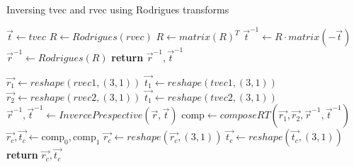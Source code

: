 
\begin{algorithm}
    \caption{Inversing tvec and rvec using Rodrigues transforms}\label{alg:inverse}
    \begin{algorithmic}[1]
        \State $\vec{t} \gets tvec$
        \State $R \gets Rodrigues(rvec)$ 
        \State $R \gets matrix(R)^{T}$ 
        \State $\vec{t}^{-1} \gets R \cdot matrix(-\vec{t})$ 
        \State $\vec{r}^{-1} \gets Rodrigues(R)$ 
        \State \textbf{return} $\vec{r}^{-1}, \vec{t}^{-1}$ 
        \EndProcedure
    \end{algorithmic}
\end{algorithm}



\begin{algorithm}
    \begin{algorithmic}[1]
        \State $\vec{r_1} \gets reshape(rvec1, (3,1))$ 
        \State $\vec{t_1} \gets reshape(tvec1, (3,1))$
        \State $\vec{r_2} \gets reshape(rvec2, (3,1))$
        \State $\vec{t_1} \gets reshape(tvec2, (3,1))$
        \State $\vec{r}^{-1}, \vec{t}^{-1} \gets InvercePrespective(\vec{r}, \vec{t})$
        \State $\text{comp} \gets composeRT(\vec{r_1}, \vec{r_2}, \vec{r}^{-1}, \vec{t}^{-1})$
            \State \( \vec{r_{c}},\vec{t_{c}}\gets\text{comp}_{0},\text{comp}_{1}\)
        \State $\vec{r_{c}} \gets reshape(\vec{r_{c}}, (3,1))$
        \State $\vec{t_{c}} \gets reshape(\vec{t_{c}}, (3,1))$
        \State \textbf{return} $\vec{r_{c}},\vec{t_{c}}$
        \EndProcedure
    \end{algorithmic}
    \caption[Relative]{
    Relative position using \textbf{composeRT}, part of \textbf{OpenCV} and the \textbf{invercePrespective} algorithm proposed in Algorithm~\ref{alg:inverse}%
    }
    \label{alg:relative}
\end{algorithm}
